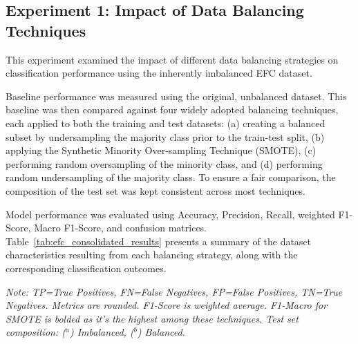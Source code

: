\documentclass[12pt]{article}
\begin{document}
\subsection{Experiment 1: Impact of Data Balancing Techniques} \label{subsec:experiment_1}

This experiment examined the impact of different data balancing strategies on classification performance using the inherently
imbalanced EFC dataset.

Baseline performance was measured using the original, unbalanced dataset. This baseline was then compared against four widely
adopted balancing techniques, each applied to both the training and test datasets: (a) creating a balanced subset by undersampling
the majority class prior to the train-test split, (b) applying the Synthetic Minority Over-sampling Technique (SMOTE), (c)
performing random oversampling of the minority class, and (d) performing random undersampling of the majority class. To
ensure a fair comparison, the composition of the test set was kept consistent across most techniques.

Model performance was evaluated using Accuracy, Precision, Recall, weighted F1-Score, Macro F1-Score, and confusion matrices.
Table~\ref{tab:efc_consolidated_results} presents a summary of the dataset characteristics resulting from each balancing
strategy, along with the corresponding classification outcomes.


\begin{table}[htbp]
  \centering
  \caption{EFC Performance Across Data Balancing Techniques (Experiment 1).}
  \label{tab:balancing_results}
  \par\medskip
  \footnotesize
  \textit{Note: TP=True Positives, FN=False Negatives, FP=False Positives, TN=True Negatives. Metrics are rounded. F1-Score
    is weighted average. F1-Macro for SMOTE is bolded as it's the highest among these techniques. Test set composition:
    ($^{a}$) Imbalanced, ($^{b}$) Balanced.}
\end{table}
\end{document}
